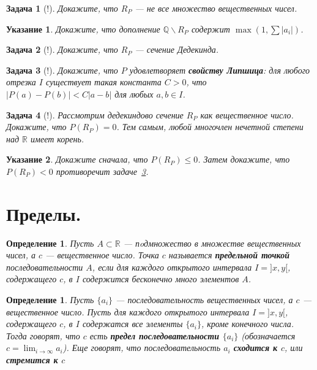 \documentclass[12pt]{book}
\newcommand{\subs}{\section}
\def\R{{\mathbb R}}
\def\Q{{\mathbb Q}}
\theoremstyle{upshape}
\newtheorem{zadacha}{Задача}[chapter]
\theoremstyle{generic}
\newtheorem{opredelenie}[teorema]{Определение}
\theoremstyle{upshapenonumber}
\newtheorem{ukazanie}{Указание}[section]
\newcommand{\следствие}{%
     \refstepcounter{teorema}
     {\noindent\bf Следствие \thechapter.\arabic{teorema}:\ }}
\newcommand{\пример}{%
     \refstepcounter{teorema}
     {\noindent\bf Пример \thechapter.\arabic{teorema}:\ }}
\newcommand{\лемма}{%
     \refstepcounter{teorema}
     {\noindent\bf Лемма \thechapter.\arabic{teorema}:\ }}
\newcommand{\теорема}{%
     \refstepcounter{teorema}
     {\noindent\bf Теорема \thechapter.\arabic{teorema}:\ }}
\newcommand{\утверждение}{%
     \refstepcounter{teorema}
     {\noindent\bf Утверждение \thechapter.\arabic{teorema}:\ }}
\begin{document}
\begin{zadacha}[!] 
Докажите, что $R_P$ --- не все множество вещественных чисел.
\end{zadacha}

\begin{ukazanie} Докажите, что дополнение $\Q \backslash R_P$ 
содержит $\max(1, \sum |a_i|)$.
\end{ukazanie}

\begin{zadacha}[!] Докажите, что $R_P$ --- сечение Дедекинда. 
\end{zadacha}

\begin{zadacha}[!]\label{lips} 
Докажите, что $P$ удовлетворяет {\bf свойству Липшица}: для любого
отрезка $I$ существует такая константа $C > 0$, что $|P(a)-P(b)| <
C|a-b|$ для любых $a,b \in I$.
\end{zadacha}

\begin{zadacha}[!] Рассмотрим дедекиндово сечение 
$R_P$ как вещественное число. Докажите, что $P(R_P)=0$. Тем самым,
любой многочлен нечетной степени над $\R$ имеет корень.
\end{zadacha}

\begin{ukazanie}
Докажите сначала, что $P(R_P) \leq 0$. Затем докажите, что $P(R_P) <
0$ противоречит задаче~\ref{lips}.
\end{ukazanie}

\subs{Пределы.}

\begin{opredelenie} Пусть $A\subset \R$ --- пoдмножество в
множестве вещественных чисел, а $c$ --- вещественное число. Точка $c$
называется {\bf предельной точкой} последовательности $A$, если для
каждого открытого интервала $I = ]x, y[$, содержащего $c$, в $I$
содержится бесконечно много элементов $A$.
\end{opredelenie}

\begin{opredelenie} Пусть $\{a_i\}$ --- последовательность
вещественных чисел, а $c$ --- вещественное число. Пусть для каждого
открытого интервала $I = ]x, y[$, содержащего $c$, в $I$ содержатся
все элементы $\{a_i\}$, кроме конечного числа. Тогда говорят, что
$c$ есть {\bf предел последовательности $\{a_i\}$} (обозначается $c
= \lim_{i \to \infty} a_i $). Еще говорят, что последовательность
$a_i$ {\bf сходится к $c$}, или {\bf стремится к $c$}
\end{opredelenie}
\end{document}
